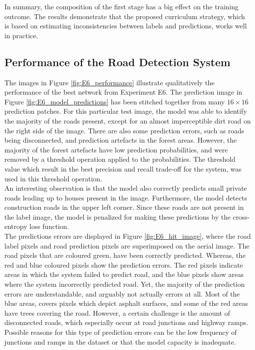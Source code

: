 In summary, the composition of the first stage has a big effect on the training outcome. The results demonstrate that the proposed curriculum strategy, which is based on estimating inconsistencies between labels and predictions, works well in practice.

\subsection{Performance of the Road Detection System}
The images in Figure \ref{fig:E6_performance} illustrate qualitatively the performance of the best network from Experiment E6. The prediction image in Figure \ref{fig:E6_model_predictions} has been stitched together from many $16 \times 16$ prediction patches. For this particular test image, the model was able to identify the majority of the roads present, except for an almost imperceptible dirt road on the right side of the image. There are also some prediction errors, such as roads being disconnected, and prediction artefacts in the forest areas. However, the majority of the forest artefacts have low prediction probabilities, and were removed by a threshold operation applied to the probabilities. The threshold value which result in the best precision and recall trade-off for the system, was used in this threshold operation.\\

An interesting observation is that the model also correctly predicts small private roads leading up to houses present in the image. Furthermore, the model detects construction roads in the upper left corner. Since these roads are not present in the label image, the model is penalized for making these predictions by the cross-entropy loss function.\\

The predictions errors are displayed in Figure \ref{fig:E6_hit_image}, where the road label pixels and road prediction pixels are superimposed on the aerial image. The road pixels that are coloured green, have been correctly predicted. Whereas, the red and blue coloured pixels show the prediction errors. The red pixels indicate areas in which the system failed to predict road, and the blue pixels show areas where the system incorrectly predicted road. Yet, the majority of the prediction errors are understandable, and arguably not actually errors at all. Most of the blue areas, covers pixels which depict asphalt surfaces, and some of the red areas have trees covering the road. However, a certain challenge is the amount of disconnected roads, which especially occur at road junctions and highway ramps. Possible reasons for this type of prediction errors can be the low frequency of junctions and ramps in the dataset or that the model capacity is inadequate. \\

